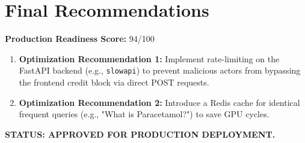 \documentclass[12pt,a4paper]{article}
\begin{document}
\section{Final Recommendations}
\textbf{Production Readiness Score:} 94/100

\begin{enumerate}
    \item \textbf{Optimization Recommendation 1:} Implement rate-limiting on the FastAPI backend (e.g., \texttt{slowapi}) to prevent malicious actors from bypassing the frontend credit block via direct POST requests.
    \item \textbf{Optimization Recommendation 2:} Introduce a Redis cache for identical frequent queries (e.g., "What is Paracetamol?") to save GPU cycles.
\end{enumerate}

\vspace{1em}
\noindent \textbf{STATUS: APPROVED FOR PRODUCTION DEPLOYMENT.}
\end{document}
